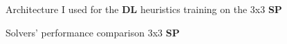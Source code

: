 \begin{figure}
  \noindent
  \caption[33SPnet]{Architecture I used for the \textbf{DL} heuristics training on the 3x3 \textbf{SP}}
  \label{fig:33SPnets}
\end{figure}



\begin{figure}[H]
  \noindent
  \caption[33SPPerformance]{Solvers' performance comparison 3x3 \textbf{SP}}
  \label{fig:33SPPerformance}
\end{figure}


